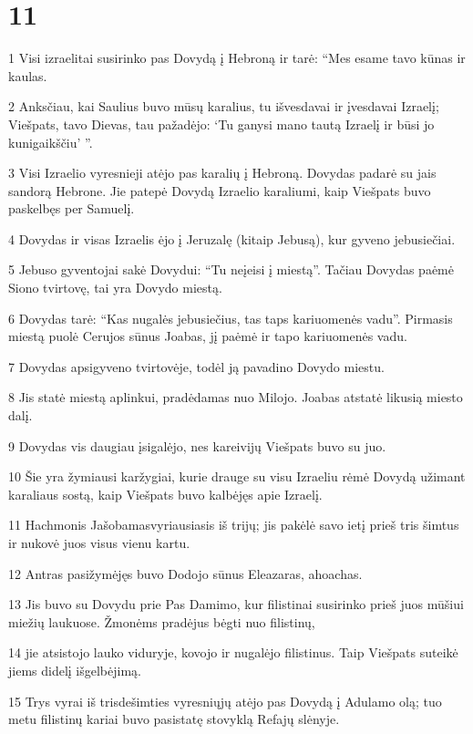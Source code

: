 \chapter{11}


\par 1 Visi izraelitai susirinko pas Dovydą į Hebroną ir tarė: “Mes esame tavo kūnas ir kaulas. 
\par 2 Anksčiau, kai Saulius buvo mūsų karalius, tu išvesdavai ir įvesdavai Izraelį; Viešpats, tavo Dievas, tau pažadėjo: ‘Tu ganysi mano tautą Izraelį ir būsi jo kunigaikščiu’ ”. 
\par 3 Visi Izraelio vyresnieji atėjo pas karalių į Hebroną. Dovydas padarė su jais sandorą Hebrone. Jie patepė Dovydą Izraelio karaliumi, kaip Viešpats buvo paskelbęs per Samuelį. 
\par 4 Dovydas ir visas Izraelis ėjo į Jeruzalę (kitaip Jebusą), kur gyveno jebusiečiai. 
\par 5 Jebuso gyventojai sakė Dovydui: “Tu neįeisi į miestą”. Tačiau Dovydas paėmė Siono tvirtovę, tai yra Dovydo miestą. 
\par 6 Dovydas tarė: “Kas nugalės jebusiečius, tas taps kariuomenės vadu”. Pirmasis miestą puolė Cerujos sūnus Joabas, jį paėmė ir tapo kariuomenės vadu. 
\par 7 Dovydas apsigyveno tvirtovėje, todėl ją pavadino Dovydo miestu. 
\par 8 Jis statė miestą aplinkui, pradėdamas nuo Milojo. Joabas atstatė likusią miesto dalį. 
\par 9 Dovydas vis daugiau įsigalėjo, nes kareivijų Viešpats buvo su juo. 
\par 10 Šie yra žymiausi karžygiai, kurie drauge su visu Izraeliu rėmė Dovydą užimant karaliaus sostą, kaip Viešpats buvo kalbėjęs apie Izraelį. 
\par 11 Hachmonis Jašobamas­vyriausiasis iš trijų; jis pakėlė savo ietį prieš tris šimtus ir nukovė juos visus vienu kartu. 
\par 12 Antras pasižymėjęs buvo Dodojo sūnus Eleazaras, ahoachas. 
\par 13 Jis buvo su Dovydu prie Pas Damimo, kur filistinai susirinko prieš juos mūšiui miežių laukuose. Žmonėms pradėjus bėgti nuo filistinų, 
\par 14 jie atsistojo lauko viduryje, kovojo ir nugalėjo filistinus. Taip Viešpats suteikė jiems didelį išgelbėjimą. 
\par 15 Trys vyrai iš trisdešimties vyresniųjų atėjo pas Dovydą į Adulamo olą; tuo metu filistinų kariai buvo pasistatę stovyklą Refajų slėnyje. 
